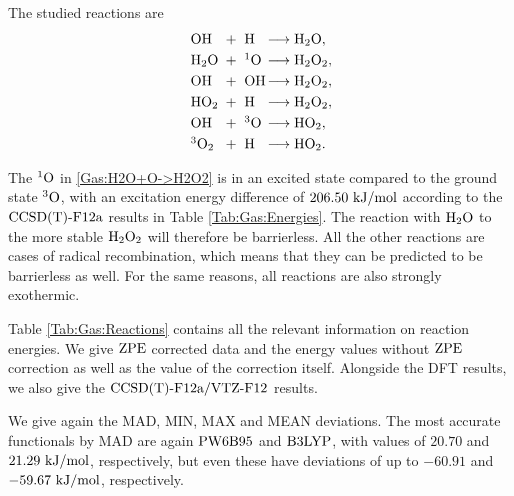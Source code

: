 \documentclass[8.5pt,twoside,twocolumn]{article}
\newcommand\zpe{\enmat{\te{ZPE}}}
\newcommand\singo{\enmat{{^1\te{O}}}}
\newcommand\tripo{\enmat{{^3\te{O}}}}
\newcommand\kmo{\enmat{\te {kJ/mol}}}
\theoremstyle{standard}
\begin{document}
The studied reactions are
\newcommand\ronebox[1]{\makebox[.8cm][l]{\enmat{#1}}}
\newcommand\rtwobox[1]{\makebox[.7cm][l]{\ \enmat{#1}}}
\newcommand\prodbox[1]{\makebox[1.55cm][l]{\enmat{#1}}}
\begin{subequations}
\begin{align}
   \label{Gas:HO+H->H2O}
   \ronebox{\ho}+\rtwobox{\te{H}}\prodbox{\chemar\hto,} \\ 
   \label{Gas:H2O+O->H2O2}
   \ronebox{\hto}+\rtwobox{^1\te{O}}\prodbox{\chemar\htot,} \\
   \label{Gas:HO+HO->H2O2}
   \ronebox{\ho}+\rtwobox{\ho}\prodbox{\chemar\htot,} \\
   \label{Gas:HO2+H->H2O2}
   \ronebox{\hot}+\rtwobox{\te{H}}\prodbox{\chemar\htot,} \\
   \label{Gas:HO+O->HO2}
   \ronebox{\ho}+\rtwobox{^3\te{O}}\prodbox{\chemar\hot,} \\
   \label{Gas:3O2+H->HO2}
   \ronebox{^3\ot}+\rtwobox{\te{H}}\prodbox{\chemar\hot.}
\end{align}
\label{Gas:Reactions}
\end{subequations}


The $\singo$ in \eqref{Gas:H2O+O->H2O2} is in an excited state
compared to the ground state $\tripo$, with an excitation energy difference
of $206.50~\kmo$ according to the $\text{CCSD(T)-F12a}$ results in Table
\ref{Tab:Gas:Energies}. The reaction with $\text H _2 \text O$ to the more stable
$\text H _2 \text O_2$ will therefore be barrierless. All the other reactions are cases of
radical recombination, which means that they can be predicted to be barrierless
as well. For the same reasons, all reactions are also strongly exothermic.

Table \ref{Tab:Gas:Reactions} contains all the relevant information on
reaction energies. We give $\zpe$ corrected data and the energy
values without $\zpe$ correction as well as the value of the correction
itself. Alongside the DFT results, we also give the $\text{CCSD(T)-F12a}/\text{VTZ-F}12$ results.

We give again the MAD, MIN, MAX and MEAN deviations.
The most accurate functionals by MAD are again $\text{PW6B95}$
and $\text{B3LYP}$, with values of $20.70$ and $21.29~\kmo$, respectively,
but even these have deviations of up to $-60.91$ and $-59.67~\kmo$,
respectively.
\end{document}
